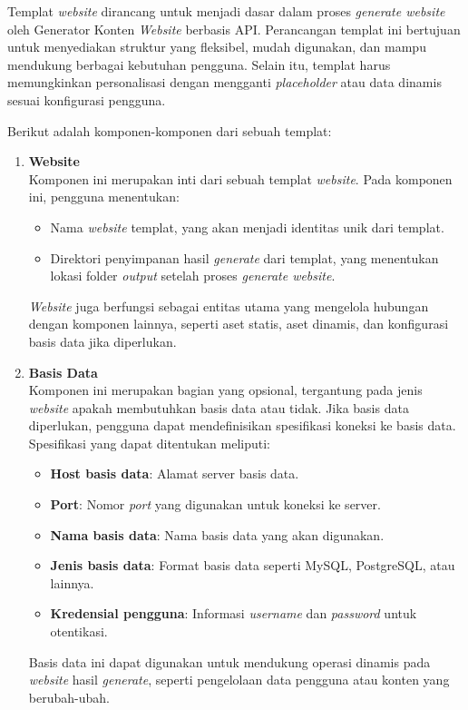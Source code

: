 Templat \textit{website} dirancang untuk menjadi dasar dalam proses \textit{generate website} oleh Generator Konten \textit{Website} berbasis API. Perancangan templat ini bertujuan untuk menyediakan struktur yang fleksibel, mudah digunakan, dan mampu mendukung berbagai kebutuhan pengguna. Selain itu, templat harus memungkinkan personalisasi dengan mengganti \textit{placeholder} atau data dinamis sesuai konfigurasi pengguna.

Berikut adalah komponen-komponen dari sebuah templat:
\begin{enumerate}[label=\alph*.]
    \item \textbf{Website}\\
        Komponen ini merupakan inti dari sebuah templat \textit{website}. Pada komponen ini, pengguna menentukan:
        \begin{itemize}
            \item Nama \textit{website} templat, yang akan menjadi identitas unik dari templat.
            \item Direktori penyimpanan hasil \textit{generate} dari templat, yang menentukan lokasi folder \textit{output} setelah proses \textit{generate website}.
        \end{itemize}
        \textit{Website} juga berfungsi sebagai entitas utama yang mengelola hubungan dengan komponen lainnya, seperti aset statis, aset dinamis, dan konfigurasi basis data jika diperlukan.

    \item \textbf{Basis Data}\\
        Komponen ini merupakan bagian yang opsional, tergantung pada jenis \textit{website} apakah membutuhkan basis data atau tidak. Jika basis data diperlukan, pengguna dapat mendefinisikan spesifikasi koneksi ke basis data. Spesifikasi yang dapat ditentukan meliputi:
        \begin{itemize}
            \item \textbf{Host basis data}: Alamat server basis data.
            \item \textbf{Port}: Nomor \textit{port} yang digunakan untuk koneksi ke server.
            \item \textbf{Nama basis data}: Nama basis data yang akan digunakan.
            \item \textbf{Jenis basis data}: Format basis data seperti MySQL, PostgreSQL, atau lainnya.
            \item \textbf{Kredensial pengguna}: Informasi \textit{username} dan \textit{password} untuk otentikasi.
        \end{itemize}
        Basis data ini dapat digunakan untuk mendukung operasi dinamis pada \textit{website} hasil \textit{generate}, seperti pengelolaan data pengguna atau konten yang berubah-ubah.


\end{enumerate}
